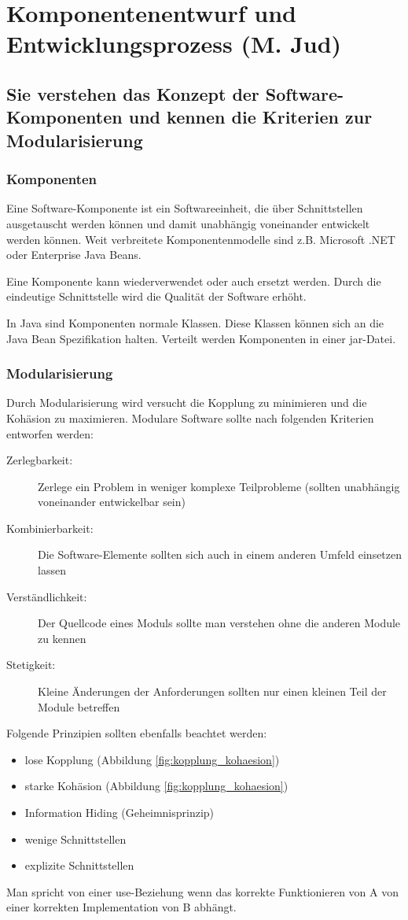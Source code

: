 \section{Komponentenentwurf und Entwicklungsprozess (M. Jud)}
\label{sec:jud}

\subsection{Sie verstehen das Konzept der Software-Komponenten und kennen die Kriterien zur Modularisierung}

\subsubsection{Komponenten}

Eine Software-Komponente ist ein Softwareeinheit, die über Schnittstellen ausgetauscht werden können und damit unabhängig voneinander entwickelt werden können. Weit verbreitete Komponentenmodelle sind z.B. Microsoft .NET oder Enterprise Java Beans.

Eine Komponente kann wiederverwendet oder auch ersetzt werden. Durch die eindeutige Schnittstelle wird die Qualität der Software erhöht. 

In Java sind Komponenten normale Klassen. Diese Klassen können sich an die Java Bean Spezifikation halten. Verteilt werden Komponenten in einer jar-Datei.

\subsubsection{Modularisierung}

Durch Modularisierung wird versucht die Kopplung zu minimieren und die Kohäsion zu maximieren. Modulare Software sollte nach folgenden Kriterien entworfen werden:
\begin{description}
	\item[Zerlegbarkeit:] Zerlege ein Problem in weniger komplexe Teilprobleme (sollten unabhängig voneinander entwickelbar sein)
	\item[Kombinierbarkeit:] Die Software-Elemente sollten sich auch in einem anderen Umfeld einsetzen lassen
	\item[Verständlichkeit:] Der Quellcode eines Moduls sollte man verstehen ohne die anderen Module zu kennen
	\item[Stetigkeit:] Kleine Änderungen der Anforderungen sollten nur einen kleinen Teil der Module betreffen
\end{description}
Folgende Prinzipien sollten ebenfalls beachtet werden:
\begin{itemize}
	\item lose Kopplung (Abbildung \ref{fig:kopplung_kohaesion})
	\item starke Kohäsion (Abbildung \ref{fig:kopplung_kohaesion})
	\item Information Hiding (Geheimnisprinzip)
	\item wenige Schnittstellen
	\item explizite Schnittstellen
\end{itemize}
Man spricht von einer use-Beziehung wenn das korrekte Funktionieren von A von einer korrekten Implementation von B abhängt.

